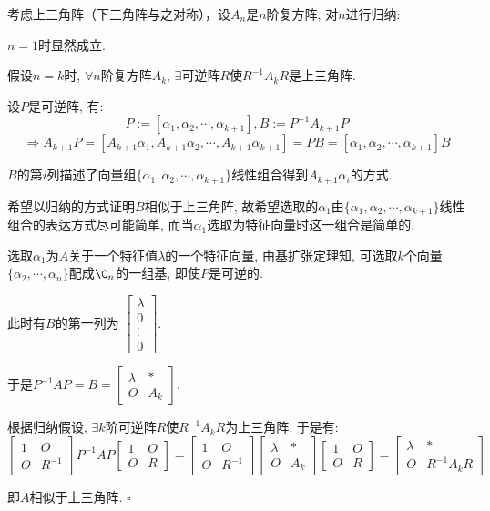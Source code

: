 \documentclass[UTF8]{ctexart}
\begin{document}
		\begin{prf} 
		
			考虑上三角阵（下三角阵与之对称），设$A_n$是$n$阶复方阵, 对$n$进行归纳: 

			$n=1$时显然成立. 

			假设$n=k$时, $\forall n$阶复方阵$A_k$, $\exists$可逆阵$R$使$R^{-1}A_k R$是上三角阵. 
			
			设$P$是可逆阵, 有: 
			\[P:=[\alpha_1,\alpha_2,\cdots,\alpha_{k+1}], B:=P^{-1}A_{k+1}P\]
			\[\Longrightarrow A_{k+1}P=[A_{k+1}\alpha_1,A_{k+1}\alpha_2,\cdots,A_{k+1}\alpha_{k+1}]=PB=[\alpha_1,\alpha_2,\cdots,\alpha_{k+1}]B\]
			
			$B$的第$i$列描述了向量组$\{\alpha_1,\alpha_2,\cdots,\alpha_{k+1}\}$线性组合得到$A_{k+1}\alpha_i$的方式. 

			希望以归纳的方式证明$B$相似于上三角阵, 故希望选取的$\alpha_1$由$\{\alpha_1,\alpha_2,\cdots,\alpha_{k+1}\}$线性组合的表达方式尽可能简单, 而当$\alpha_1$选取为特征向量时这一组合是简单的. 

			选取$\alpha_1$为$A$关于一个特征值$\lambda$的一个特征向量, 由基扩张定理知, 可选取$k$个向量$\{\alpha_2,\cdots,\alpha_n\}$配成$\C_n$的一组基, 即使$P$是可逆的. 
			
			此时有$B$的第一列为
			$\begin{bmatrix}
				\lambda\\
				0\\
				\vdots\\
				0
			\end{bmatrix}$. 
			
			于是$P^{-1}AP=B=
			\begin{bmatrix}
				\lambda & *\\
				O & A_{k}
			\end{bmatrix}$. 

			根据归纳假设, $\exists k$阶可逆阵$R$使$R^{-1}A_{k}R$为上三角阵, 于是有: 
			\[\begin{bmatrix}
				1 & O\\
				O & R^{-1}
			\end{bmatrix}
			P^{-1}AP
			\begin{bmatrix}
				1 & O\\
				O & R
			\end{bmatrix}=
			\begin{bmatrix}
				1 & O\\
				O & R^{-1}
			\end{bmatrix}
			\begin{bmatrix}
				\lambda & *\\
				O & A_{k}
			\end{bmatrix}
			\begin{bmatrix}
				1 & O\\
				O & R
			\end{bmatrix}=
			\begin{bmatrix}
				\lambda & *\\
				O & R^{-1}A_k R
			\end{bmatrix}\]

			即$A$相似于上三角阵. $\square$
		\end{prf}
	
\end{document}
